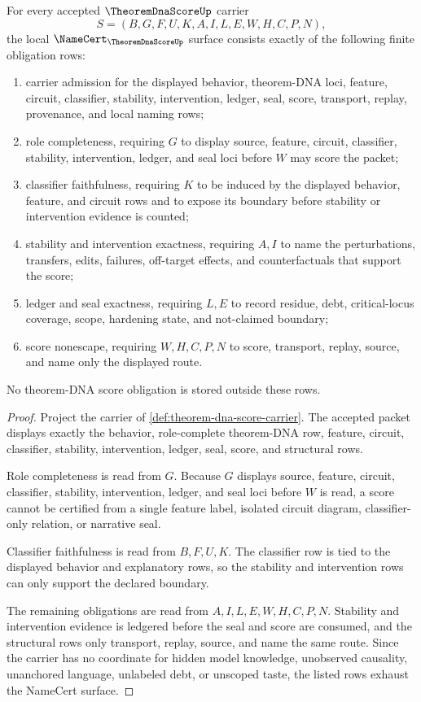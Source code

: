 \begin{theorem}
\label{thm:theorem-dna-score-namecert-obligations}
For every accepted $\TheoremDnaScoreUp$ carrier
$$
S=(B,G,F,U,K,A,I,L,E,W,H,C,P,N),
$$
the local $\NameCert_{\TheoremDnaScoreUp}$ surface consists exactly of the following finite obligation rows:
\begin{enumerate}
\item carrier admission for the displayed behavior, theorem-DNA loci, feature, circuit, classifier, stability, intervention, ledger, seal, score, transport, replay, provenance, and local naming rows;
\item role completeness, requiring $G$ to display source, feature, circuit, classifier, stability, intervention, ledger, and seal loci before $W$ may score the packet;
\item classifier faithfulness, requiring $K$ to be induced by the displayed behavior, feature, and circuit rows and to expose its boundary before stability or intervention evidence is counted;
\item stability and intervention exactness, requiring $A,I$ to name the perturbations, transfers, edits, failures, off-target effects, and counterfactuals that support the score;
\item ledger and seal exactness, requiring $L,E$ to record residue, debt, critical-locus coverage, scope, hardening state, and not-claimed boundary;
\item score nonescape, requiring $W,H,C,P,N$ to score, transport, replay, source, and name only the displayed route.
\end{enumerate}
No theorem-DNA score obligation is stored outside these rows.
\end{theorem}
\begin{proof}
Project the carrier of \autoref{def:theorem-dna-score-carrier}. The accepted packet displays exactly the behavior, role-complete theorem-DNA row, feature, circuit, classifier, stability, intervention, ledger, seal, score, and structural rows.

Role completeness is read from $G$. Because $G$ displays source, feature, circuit, classifier, stability, intervention, ledger, and seal loci before $W$ is read, a score cannot be certified from a single feature label, isolated circuit diagram, classifier-only relation, or narrative seal.

Classifier faithfulness is read from $B,F,U,K$. The classifier row is tied to the displayed behavior and explanatory rows, so the stability and intervention rows can only support the declared boundary.

The remaining obligations are read from $A,I,L,E,W,H,C,P,N$. Stability and intervention evidence is ledgered before the seal and score are consumed, and the structural rows only transport, replay, source, and name the same route. Since the carrier has no coordinate for hidden model knowledge, unobserved causality, unanchored language, unlabeled debt, or unscoped taste, the listed rows exhaust the NameCert surface.
\end{proof}

